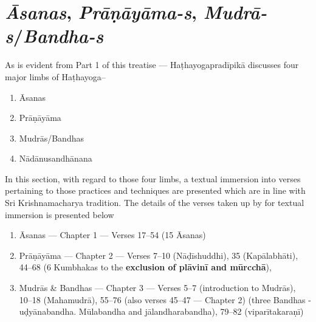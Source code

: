 \part{\textit{Āsanas}, \textit{Prāṇāyāma-s}, \textit{Mudrā-s}/\textit{Bandha-s}}


As is evident from Part 1 of this treatise --- Haṭhayogapradīpikā discusses four major limbs of Haṭhayoga–  
\begin{enumerate}
\itemsep=0pt
\renewcommand{\theenumi}{\alph{enumi}}
\renewcommand{\labelenumi}{\theenumi)}
\item Āsanas 
\item Prāṇāyāma 
\item Mudrās/Bandhas 
\item Nādānusandhānana 
\end{enumerate}

In this section, with regard to those four limbs, a textual immersion into verses pertaining to those practices and techniques are presented which are in line with Sri Krishnamacharya tradition. The details of the verses taken up by for textual immersion is presented below

\begin{enumerate}
\itemsep=0pt
\item Āsanas --- Chapter 1 --- Verses 17--54 (15 Āsanas)
\item Prāṇāyāma --- Chapter 2 ---  Verses 7--10 (Nāḍīshuddhi), 35 (Kapālabhāti), 44--68 (6 Kumbhakas to the \textbf{exclusion of plāvinī and mūrcchā}), 
\item Mudrās \& Bandhas --- Chapter 3 --- Verses 5--7 (introduction to Mudrās), 10--18 (Mahamudrā), 55--76 (also verses 45--47 --- Chapter 2) (three Bandhas - uḍyānabandha. Mūlabandha and jālandharabandha), 79--82 (viparītakaraṇī)
\end{enumerate}


